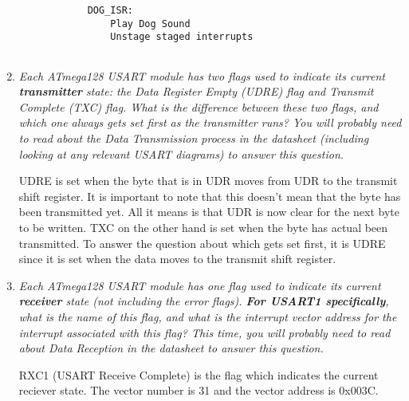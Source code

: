 \documentclass[12pt,letterpaper]{article}
\begin{document}
\begin{enumerate}
\begin{verbatim}
			DOG_ISR:
				Play Dog Sound
				Unstage staged interrupts
				
		\end{verbatim}
		
		
		\item
		\textit{Each ATmega128 USART module has two flags used to indicate its current \textbf{transmitter} state: the Data Register Empty (UDRE) flag and Transmit Complete (TXC) flag. 
		What is the difference between these two flags, and which one always gets set first as the transmitter runs? 
		You will probably need to read about the\textit{ Data Transmission} process in the datasheet (including looking at any relevant USART diagrams) to answer this question.}
		
		UDRE is set when the byte that is in UDR moves from UDR to the transmit shift register. 
		It is important to note that this doesn't mean that the byte has been transmitted yet.
		All it means is that UDR is now clear for the next byte to be written. 
		TXC on the other hand is set when the byte has actual been transmitted.
		To answer the question about which gets set first, it is UDRE since it is set when the data moves to the transmit shift register.
		
		
		
		
		\item
		\textit{Each ATmega128 USART module has one flag used to indicate its current \textbf{receiver} state (not including the error flags). \textbf{For USART1 specifically}, what is the name of this flag, and what is the interrupt vector address for the interrupt associated with this flag? 
		This time, you will probably need to read about Data Reception in the datasheet to answer this question.}
		
		RXC1 (USART Receive Complete) is the flag which indicates the current reciever state.
		The vector number is 31 and the vector address is 0x003C.
		
		
		
	\end{enumerate}
\end{document}

